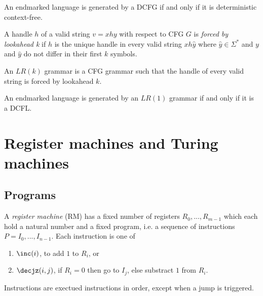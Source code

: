 \documentclass{article}
\begin{document}
\begin{theorem}
	An endmarked language is generated by a DCFG if and only if it is deterministic context-free.
\end{theorem}

\begin{definition}
	A handle $h$ of a valid string $v=xhy$ with respect to CFG $G$ is \emph{forced by lookahead k}
	if $h$ is the unique handle in every valid string $xh\hat y$ where $\hat y\in\Sigma^*$ and
	$y$ and $\hat y$ do not differ in their first $k$ symbols.

	An $LR(k)$ grammar is a CFG grammar such that the handle of every valid string is forced by
	lookahead $k$.
\end{definition}

\begin{theorem}[Sipser p. 154]
	An endmarked language is generated by an $LR(1)$ grammar if and only if it is a DCFL.
\end{theorem}

\section{Register machines and Turing machines}

\subsection{Programs}

\begin{definition}[Notes I.1]
	A \emph{register machine} (RM) has a fixed number of registers $R_0,...,R_{m-1}$
	which each hold a natural number and a fixed program, i.e. a sequence of
	instructions $P=I_0,...,I_{n-1}$. Each instruction is one of
	\begin{enumerate}
		\item $\inc(i)$, to add $1$ to $R_i$, or
		\item $\decjz(i,j)$, if $R_i=0$ then go to $I_j$, else substract $1$ from $R_i$.
	\end{enumerate}
	Instructions are exectued instructions in order, except when
	a jump is triggered.
\end{definition}
\end{document}
